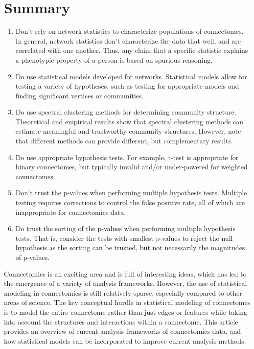\section{Summary}

\begin{summary}
\begin{enumerate}
    \item Don't rely on network statistics to characterize populations of connectomes. In general, network statistics don't characterize the data that well, and are correlated with one another. Thus, any claim that a specific statistic explains a phenotypic property of a person is based on spurious reasoning.
    \item Do use statistical models developed for networks. Statistical models allow for testing a variety of hypotheses, such as testing for appropriate models and finding significant vertices or communities.
    \item Do use spectral clustering methods for determining community structure. Theoretical and empirical results show that spectral clustering methods can estimate meaningful and trustworthy community structures. However, note that different methods can provide different, but complementary results. 
    \item Do use appropriate hypothesis tests. For example, t-test is appropriate for binary connectomes, but typically invalid and/or under-powered for weighted connectomes.
    \item Don't trust the p-values when performing multiple hypothesis tests. Multiple testing requires corrections to control the false positive rate, all of which are inappropriate for connectomics data.
    \item Do trust the sorting of the p-values when performing multiple hypothesis tests. That is, consider the tests with smallest p-values to reject the null hypothesis as the sorting can be trusted, but not necessarily the magnitudes of p-values. 
\end{enumerate}
\end{summary}

Connectomics is an exciting area and is full of interesting ideas, which has led to the emergence of a variety of analysis frameworks. However, the use of statistical modeling in connectomics is still relatively sparse, especially compared to other areas of science. The key conceptual hurdle in statistical modeling of connectomes is to model the entire connectome rather than just edges or features while taking into account the structures and interactions within a connectome. This article provides an overview of current analysis frameworks of connectomics data, and how statistical models can be incorporated to improve current analysis methods. %
